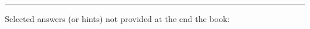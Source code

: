 \documentclass[12pt]{article}
\begin{document}



\rule{500pt}{1pt}
\bigskip


Selected answers (or hints) not provided at the end the book:
\begin{itemize}  %






%
%


\end{itemize}
\end{document}
